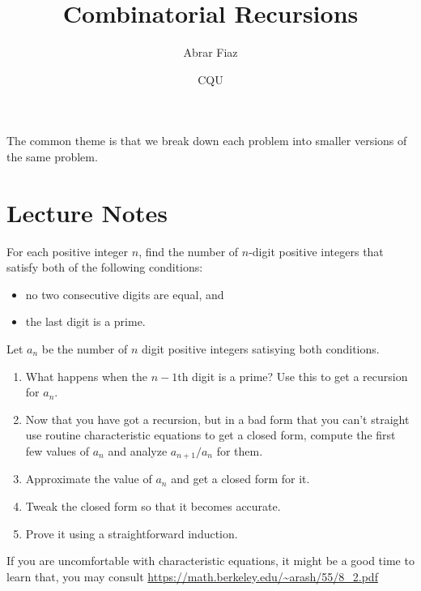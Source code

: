 \documentclass[mast]{lucky}
\title{Combinatorial Recursions}
\author{Abrar Fiaz}
\date{CQU}
\begin{document}
\maketitle

The common theme is that we break down each problem into smaller versions of the same problem.





\section{Lecture Notes}


\begin{exam}[USAJMO 2018/1]
For each positive integer $n$, find the number of $n$-digit positive integers that satisfy both of the following conditions:
\begin{itemize}
\item no two consecutive digits are equal, and
\item the last digit is a prime.
\end{itemize}
\end{exam}

\begin{walk}
Let $a_n$ be the number of $n$ digit positive integers satisying both conditions.

\begin{enumerate}
\item What happens when the $n-1$th digit is a prime? Use this to get a recursion for $a_n.$
\item Now that you have got a recursion, but in a bad form that you can't straight use routine characteristic equations to get a closed form, compute the first few 
values of $a_n$ and analyze $a_{n+1}/a_n$ for them.
\item Approximate the value of $a_n$ and get a closed form for it.
\item Tweak the closed form so that it becomes accurate.
\item Prove it using a straightforward induction. 
\end{enumerate}
\end{walk}

If you are uncomfortable with characteristic equations, it might be a good time to learn that, you may consult  \href{}{\url{https://math.berkeley.edu/~arash/55/8_2.pdf}}
\end{document}
